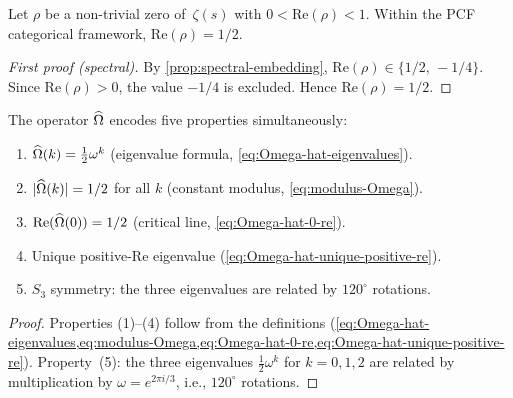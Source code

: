 \begin{theorem}\label{thm:rh-spectral}
Let $\rho$ be a non-trivial zero of~$\zeta(s)$ with
$0<\mathrm{Re}(\rho)<1$.  Within the PCF categorical framework,
$\mathrm{Re}(\rho) = 1/2$.
\end{theorem}

\begin{proof}[First proof (spectral)]
By \cref{prop:spectral-embedding},
$\mathrm{Re}(\rho)\in\{1/2,\,-1/4\}$.  Since
$\mathrm{Re}(\rho)>0$, the value $-1/4$ is excluded.  Hence
$\mathrm{Re}(\rho)=1/2$.
\end{proof}


\begin{theorem}\label{thm:omega-master}
The operator $\widehat{\Omega}$ encodes five properties simultaneously:
\begin{enumerate}[label=(\arabic*), leftmargin=2.5em]
  \item $\widehat{\Omega}(k) = \tfrac{1}{2}\omega^k$ (eigenvalue formula, \cref{eq:Omega-hat-eigenvalues}).
  \item $|\widehat{\Omega}(k)| = 1/2$ for all $k$ (constant modulus, \cref{eq:modulus-Omega}).
  \item $\mathrm{Re}(\widehat{\Omega}(0)) = 1/2$ (critical line, \cref{eq:Omega-hat-0-re}).
  \item Unique positive-Re eigenvalue (\cref{eq:Omega-hat-unique-positive-re}).
  \item $S_3$ symmetry: the three eigenvalues are related by $120^\circ$ rotations.
\end{enumerate}
\end{theorem}

\begin{proof}
Properties (1)--(4) follow from the definitions
(\cref{eq:Omega-hat-eigenvalues,eq:modulus-Omega,eq:Omega-hat-0-re,eq:Omega-hat-unique-positive-re}).
Property~(5): the three eigenvalues $\tfrac{1}{2}\omega^k$ for $k=0,1,2$
are related by multiplication by $\omega = e^{2\pi i/3}$, i.e.,
$120^\circ$ rotations.
\end{proof}



